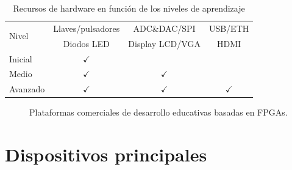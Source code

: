 \documentclass[conference]{IEEEtran}
\begin{document}
\begin{table}[!t]
\renewcommand{\arraystretch}{1.3}
\caption{Recursos de hardware en función de los niveles de aprendizaje}
\label{tab:rec-plataforma}
\centering
\begin{tabular}{|l|c|c|c|}
\hline
\multirow{2}{*}{Nivel} & Llaves/pulsadores & ADC\&DAC/SPI & USB/ETH \\
                       & Diodos LED & Display LCD/VGA & HDMI \\
\hline
Inicial & $\checkmark$ & & \\
\hline
Medio & $\checkmark$ & $\checkmark$ & \\
\hline
Avanzado & $\checkmark$ & $\checkmark$ & $\checkmark$ \\
\hline
\end{tabular}
\end{table}

\lipsum[3-4]

\begin{figure}[!t]
  \centering
  \hfil
  \hfil
  \caption{Plataformas comerciales de desarrollo educativas basadas en FPGAs.}
  \label{fig:board-fpga}
\end{figure}

\lipsum[6]

\section{Dispositivos principales}
\end{document}
